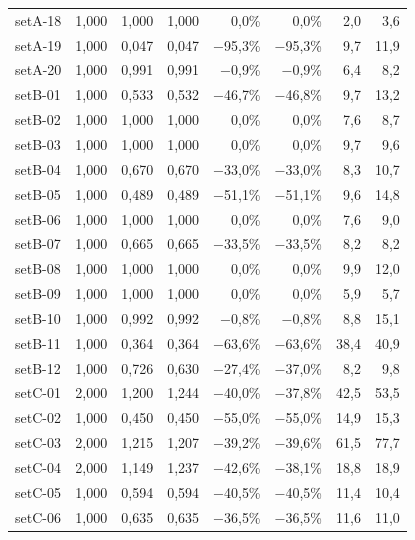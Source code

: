 \begin{table}[H]
\begin{tabular}{lrrrrrrr}
setA-18 & 1{,}000 & 1{,}000 & 1{,}000 & 0{,}0\% & 0{,}0\% & 2{,}0 & 3{,}6 \\
setA-19 & 1{,}000 & 0{,}047 & 0{,}047 & $-$95{,}3\% & $-$95{,}3\% & 9{,}7 & 11{,}9 \\
setA-20 & 1{,}000 & 0{,}991 & 0{,}991 & $-$0{,}9\% & $-$0{,}9\% & 6{,}4 & 8{,}2 \\
\midrule
setB-01 & 1{,}000 & 0{,}533 & 0{,}532 & $-$46{,}7\% & $-$46{,}8\% & 9{,}7 & 13{,}2 \\
setB-02 & 1{,}000 & 1{,}000 & 1{,}000 & 0{,}0\% & 0{,}0\% & 7{,}6 & 8{,}7 \\
setB-03 & 1{,}000 & 1{,}000 & 1{,}000 & 0{,}0\% & 0{,}0\% & 9{,}7 & 9{,}6 \\
setB-04 & 1{,}000 & 0{,}670 & 0{,}670 & $-$33{,}0\% & $-$33{,}0\% & 8{,}3 & 10{,}7 \\
setB-05 & 1{,}000 & 0{,}489 & 0{,}489 & $-$51{,}1\% & $-$51{,}1\% & 9{,}6 & 14{,}8 \\
setB-06 & 1{,}000 & 1{,}000 & 1{,}000 & 0{,}0\% & 0{,}0\% & 7{,}6 & 9{,}0 \\
setB-07 & 1{,}000 & 0{,}665 & 0{,}665 & $-$33{,}5\% & $-$33{,}5\% & 8{,}2 & 8{,}2 \\
setB-08 & 1{,}000 & 1{,}000 & 1{,}000 & 0{,}0\% & 0{,}0\% & 9{,}9 & 12{,}0 \\
setB-09 & 1{,}000 & 1{,}000 & 1{,}000 & 0{,}0\% & 0{,}0\% & 5{,}9 & 5{,}7 \\
setB-10 & 1{,}000 & 0{,}992 & 0{,}992 & $-$0{,}8\% & $-$0{,}8\% & 8{,}8 & 15{,}1 \\
setB-11 & 1{,}000 & 0{,}364 & 0{,}364 & $-$63{,}6\% & $-$63{,}6\% & 38{,}4 & 40{,}9 \\
setB-12 & 1{,}000 & 0{,}726 & 0{,}630 & $-$27{,}4\% & $-$37{,}0\% & 8{,}2 & 9{,}8 \\
\midrule
setC-01 & 2{,}000 & 1{,}200 & 1{,}244 & $-$40{,}0\% & $-$37{,}8\% & 42{,}5 & 53{,}5 \\
setC-02 & 1{,}000 & 0{,}450 & 0{,}450 & $-$55{,}0\% & $-$55{,}0\% & 14{,}9 & 15{,}3 \\
setC-03 & 2{,}000 & 1{,}215 & 1{,}207 & $-$39{,}2\% & $-$39{,}6\% & 61{,}5 & 77{,}7 \\
setC-04 & 2{,}000 & 1{,}149 & 1{,}237 & $-$42{,}6\% & $-$38{,}1\% & 18{,}8 & 18{,}9 \\
setC-05 & 1{,}000 & 0{,}594 & 0{,}594 & $-$40{,}5\% & $-$40{,}5\% & 11{,}4 & 10{,}4 \\
setC-06 & 1{,}000 & 0{,}635 & 0{,}635 & $-$36{,}5\% & $-$36{,}5\% & 11{,}6 & 11{,}0 \\

\end{tabular}
\end{table}
